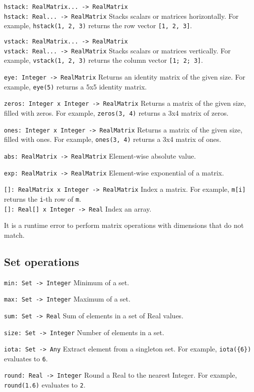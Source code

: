 \verb|hstack: RealMatrix... -> RealMatrix| \\
\verb|hstack: Real... -> RealMatrix| Stacks scalars or matrices horizontally.
For example, \verb|hstack(1, 2, 3)| returns the row vector {\tt [1, 2, 3]}.

\verb|vstack: RealMatrix... -> RealMatrix| \\
\verb|vstack: Real... -> RealMatrix| Stacks scalars or matrices vertically. For
example, \verb|vstack(1, 2, 3)| returns the column vector {\tt [1; 2; 3]}.

\verb|eye: Integer -> RealMatrix| Returns an identity matrix of the given size.
For example, \verb|eye(5)| returns a 5x5 identity matrix.

\verb|zeros: Integer x Integer -> RealMatrix| Returns a matrix of the given size, filled with zeros.  For example, \verb|zeros(3, 4)| returns a 3x4 matrix of zeros.

\verb|ones: Integer x Integer -> RealMatrix| Returns a matrix of the given
size, filled with ones.  For example, \verb|ones(3, 4)| returns a 3x4 matrix of
ones.

\verb|abs: RealMatrix -> RealMatrix| Element-wise absolute value.

\verb|exp: RealMatrix -> RealMatrix| Element-wise exponential of a matrix.

\verb|[]: RealMatrix x Integer -> RealMatrix| Index a matrix. For example,
\verb|m[i]| returns the \verb|i|-th row of \verb|m|. \\
\verb|[]: Real[] x Integer -> Real| Index an array.

It is a runtime error to perform matrix operations with dimensions that do not
match.


\subsection{Set operations}
\label{sec:builtin-set-ops}

\verb|min: Set -> Integer| Minimum of a set.

\verb|max: Set -> Integer| Maximum of a set.

\verb|sum: Set -> Real| Sum of elements in a set of Real values.

\verb|size: Set -> Integer| Number of elements in a set.

\verb|iota: Set -> Any| Extract element from a singleton set. For example,
\verb|iota({6})| evaluates to \verb|6|.


\verb|round: Real -> Integer| Round a Real to the nearest Integer.  For
example, \verb|round(1.6)| evaluates to \verb|2|.

